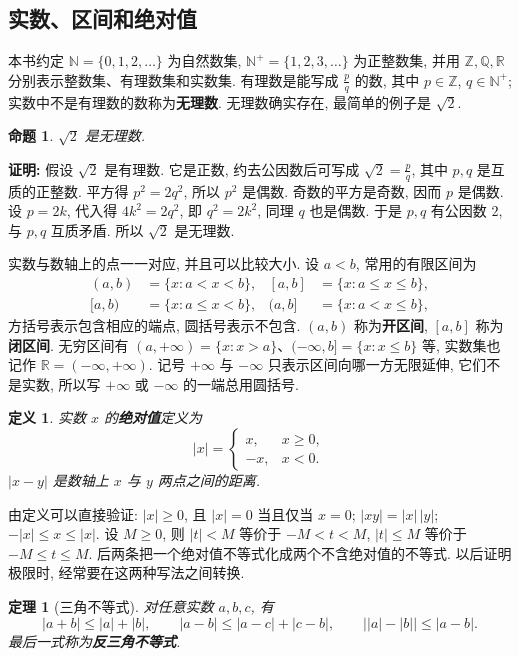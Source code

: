 \documentclass[UTF8,openany]{ctexbook}
\theoremstyle{chinesetextbook}
\newtheorem{definition}{定义}[section]
\newtheorem{theorem}{定理}[section]
\newenvironment{cnproof}{\par\indent\textbf{证明:} \ignorespaces}{\par}
\newtheorem*{propositionsingle}{命题}
\begin{document}
\subsection{实数、区间和绝对值}
本书约定 $\mathbb N=\{0,1,2,\ldots\}$ 为自然数集, $\mathbb N^+=\{1,2,3,\ldots\}$ 为正整数集, 并用 $\mathbb Z,\mathbb Q,\mathbb R$ 分别表示整数集、有理数集和实数集. 有理数是能写成 $\displaystyle\frac pq$ 的数, 其中 $p\in\mathbb Z$, $q\in\mathbb N^+$; 实数中不是有理数的数称为\textbf{无理数}. 无理数确实存在, 最简单的例子是 $\sqrt2$.
\begin{propositionsingle}
$\sqrt2$ 是无理数.
\end{propositionsingle}
\begin{cnproof}
假设 $\sqrt2$ 是有理数. 它是正数, 约去公因数后可写成 $\displaystyle\sqrt2=\frac pq$, 其中 $p,q$ 是互质的正整数. 平方得 $p^2=2q^2$, 所以 $p^2$ 是偶数. 奇数的平方是奇数, 因而 $p$ 是偶数. 设 $p=2k$, 代入得 $4k^2=2q^2$, 即 $q^2=2k^2$, 同理 $q$ 也是偶数. 于是 $p,q$ 有公因数 $2$, 与 $p,q$ 互质矛盾. 所以 $\sqrt2$ 是无理数.
\end{cnproof}
实数与数轴上的点一一对应, 并且可以比较大小. 设 $a<b$, 常用的有限区间为
\[
\begin{aligned}
(a,b)&=\{x:a<x<b\},& [a,b]&=\{x:a\le x\le b\},\\
[a,b)&=\{x:a\le x<b\},& (a,b]&=\{x:a<x\le b\},
\end{aligned}
\]
方括号表示包含相应的端点, 圆括号表示不包含. $(a,b)$ 称为\textbf{开区间}, $[a,b]$ 称为\textbf{闭区间}. 无穷区间有 $(a,+\infty)=\{x:x>a\}$、$(-\infty,b]=\{x:x\le b\}$ 等, 实数集也记作 $\mathbb R=(-\infty,+\infty)$. 记号 $+\infty$ 与 $-\infty$ 只表示区间向哪一方无限延伸, 它们不是实数, 所以写 $+\infty$ 或 $-\infty$ 的一端总用圆括号.
\begin{definition}
实数 $x$ 的\textbf{绝对值}定义为
\[
|x|=\begin{cases}x,&x\ge0,\\-x,&x<0.\end{cases}
\]
$|x-y|$ 是数轴上 $x$ 与 $y$ 两点之间的距离.
\end{definition}
由定义可以直接验证: $|x|\ge0$, 且 $|x|=0$ 当且仅当 $x=0$; $|xy|=|x|\,|y|$; $-|x|\le x\le|x|$. 设 $M\ge0$, 则 $|t|<M$ 等价于 $-M<t<M$, $|t|\le M$ 等价于 $-M\le t\le M$. 后两条把一个绝对值不等式化成两个不含绝对值的不等式. 以后证明极限时, 经常要在这两种写法之间转换.
\begin{theorem}[三角不等式]
对任意实数 $a,b,c$, 有
\[
|a+b|\le|a|+|b|,\qquad |a-b|\le|a-c|+|c-b|,\qquad \bigl||a|-|b|\bigr|\le|a-b|.
\]
最后一式称为\textbf{反三角不等式}.
\end{theorem}
\end{document}

